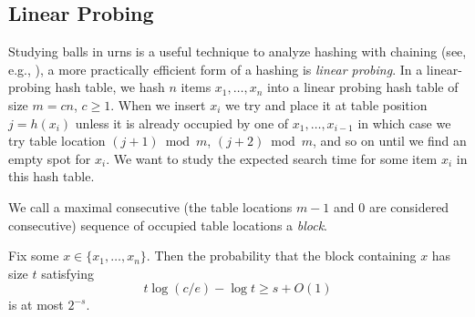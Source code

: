 \documentclass{patmorin}
\begin{document}
\subsection{Linear Probing}

Studying balls in urns is a useful technique to analyze hashing with
chaining (see, e.g., \cite[Section~5.1]{morin:open}), a more
practically efficient form of a hashing is \emph{linear probing}.  In
a linear-probing hash table, we hash $n$ items $x_1,\ldots,x_n$ into a
linear probing hash table of size $m=cn$, $c\ge 1$. When we insert
$x_i$ we try and place it at table position $j=h(x_i)$ unless it is
already occupied by one of $x_1,\ldots,x_{i-1}$ in which case we try
table location $(j+1)\bmod m$, $(j+2)\bmod m$, and so on until we find
an empty spot for $x_i$.  We want to study the expected search time
for some item $x_i$ in this hash table.

We call a maximal consecutive (the table locations $m-1$ and $0$ are
considered consecutive) sequence of occupied table locations a
\emph{block}.

\begin{thm}
  Fix some $x\in\{x_1,\ldots,x_n\}$. Then the probability that the
  block containing $x$ has size $t$ satisfying
  \[
    t \log (c/e) - \log t \ge s + O(1)
  \]
  is at most $2^{-s}$.
\end{thm}
\end{document}
